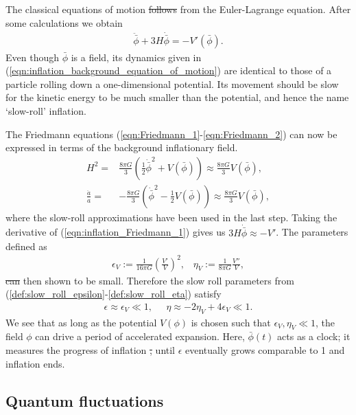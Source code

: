 \documentclass[a4paper,12pt,times,custombib,print,index]{Classes/PhDThesisPSnPDF} %
\providecommand{\DIFadd}[1]{{\protect\color{blue}\uwave{#1}}} %
\providecommand{\DIFdel}[1]{{\protect\color{red}\sout{#1}}}                      %
\providecommand{\DIFaddbegin}{} %
\providecommand{\DIFaddend}{} %
\providecommand{\DIFdelbegin}{} %
\providecommand{\DIFdelend}{} %
\newcommand{\DIFscaledelfig}{0.5}
\newlength{\DIFdelgraphicswidth} %
\newlength{\DIFdelgraphicsheight} %
\newcommand{\DIFaddincludegraphics}[2][]{{\color{blue}\fbox{\DIFOincludegraphics[#1]{#2}}}} %
\newcommand{\DIFdelincludegraphics}[2][]{%
\sbox{\DIFdelgraphicsbox}{\DIFOincludegraphics[#1]{#2}}%
\settoboxwidth{\DIFdelgraphicswidth}{\DIFdelgraphicsbox} %
\settoboxtotalheight{\DIFdelgraphicsheight}{\DIFdelgraphicsbox} %
\scalebox{\DIFscaledelfig}{%
\parbox[b]{\DIFdelgraphicswidth}{\usebox{\DIFdelgraphicsbox}\\[-\baselineskip] \rule{\DIFdelgraphicswidth}{0em}}\llap{\resizebox{\DIFdelgraphicswidth}{\DIFdelgraphicsheight}{%
\setlength{\unitlength}{\DIFdelgraphicswidth}%
\begin{picture}(1,1)%
\thicklines\linethickness{2pt} %
{\color[rgb]{1,0,0}\put(0,0){\framebox(1,1){}}}%
{\color[rgb]{1,0,0}\put(0,0){\line( 1,1){1}}}%
{\color[rgb]{1,0,0}\put(0,1){\line(1,-1){1}}}%
\end{picture}%
}\hspace*{3pt}}} %
} %
\DeclareRobustCommand{\DIFaddbegin}{\DIFOaddbegin \let\includegraphics\DIFaddincludegraphics} %
\DeclareRobustCommand{\DIFaddend}{\DIFOaddend \let\includegraphics\DIFOincludegraphics} %
\DeclareRobustCommand{\DIFdelbegin}{\DIFOdelbegin \let\includegraphics\DIFdelincludegraphics} %
\DeclareRobustCommand{\DIFdelend}{\DIFOaddend \let\includegraphics\DIFOincludegraphics} %
\begin{document}
The classical equations of motion \DIFdelbegin \DIFdel{follows }\DIFdelend \DIFaddbegin \DIFadd{are obtained }\DIFaddend from the Euler-Lagrange equation. After some calculations we obtain
\begin{align}
	\ddot{\bar{\phi}} + 3H\dot{\bar{\phi}} = - V'(\bar{\phi}). 	  \label{eqn:inflation_background_equation_of_motion}
\end{align}
Even though $\bar{\phi}$ is a field, its dynamics given in (\ref{eqn:inflation_background_equation_of_motion}) are identical to those of a particle rolling down a one-dimensional potential. Its movement should be slow for the kinetic energy to be much smaller than the potential, and hence the name `slow-roll' inflation.

The Friedmann equations (\ref{eqn:Friedmann_1}-\ref{eqn:Friedmann_2}) can now be expressed in terms of the background inflationary field.
\begin{align}
	H^2 =& \frac{8\pi G}{3} \left( \frac{1}{2} \dot{\bar{\phi}}^2 + V(\bar{\phi}) \right) \approx \frac{8\pi G}{3} V(\bar{\phi}), \label{eqn:inflation_Friedmann_1} \\
	\frac{\ddot{a}}{a} =& -\frac{8\pi G}{3} \left( \dot{\bar{\phi}}^2 - \frac{1}{2} V(\bar{\phi}) \right) \approx \frac{8\pi G}{3} V(\bar{\phi}), \label{eqn:inflation_Friedmann_2}
\end{align}
where the slow-roll approximations have been used in the last step. Taking the derivative of (\ref{eqn:inflation_Friedmann_1}) gives us $3H\dot{\bar{\phi}} \approx -V'$. The parameters defined as
\begin{align}
	\epsilon_V := \frac{1}{16\pi G} \left( \frac{V'}{V} \right)^2, \;\;\;
	\eta_V := \frac{1}{8\pi G} \frac{V''}{V},
\end{align}
\DIFdelbegin \DIFdel{can }\DIFdelend \DIFaddbegin \DIFadd{are }\DIFaddend then shown to be small. Therefore the slow roll parameters from (\ref{def:slow_roll_epsilon}-\ref{def:slow_roll_eta}) satisfy
\begin{align}
	\epsilon \approx \epsilon_V \ll 1, \;\;\;\;\; \eta \approx -2\eta_V + 4\epsilon_V \ll 1.
\end{align}
We see that as long as the potential $V(\phi)$ is chosen such that $\epsilon_V, \eta_V \ll 1$, the field $\phi$ can drive a period of accelerated expansion. Here, $\bar{\phi}(t)$ acts as a clock; it measures the progress of inflation \DIFdelbegin \DIFdel{, }\DIFdelend until $\epsilon$ eventually grows comparable to 1 and inflation ends.

\subsection{Quantum fluctuations} \label{section:quantum_fluctuations}
\end{document}
